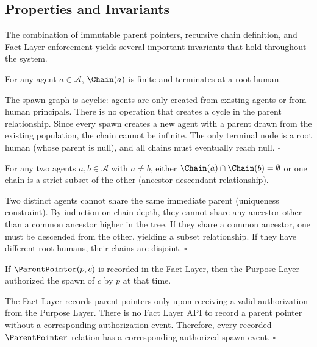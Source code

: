 \begin{algorithm}[H]
\subsection{Properties and Invariants}

The combination of immutable parent pointers, recursive chain definition, and Fact Layer enforcement yields several important invariants that hold throughout the system.

\begin{prop}
For any agent $a \in \mathcal{A}$, $\Chain(a)$ is finite and terminates at a root human.
\end{prop}
\begin{Proof}
The spawn graph is acyclic: agents are only created from existing agents or from human principals. There is no operation that creates a cycle in the parent relationship. Since every spawn creates a new agent with a parent drawn from the existing population, the chain cannot be infinite. The only terminal node is a root human (whose parent is null), and all chains must eventually reach null. $\square$
\end{Proof}

\begin{prop}
For any two agents $a, b \in \mathcal{A}$ with $a \neq b$, either $\Chain(a) \cap \Chain(b) = \emptyset$ or one chain is a strict subset of the other (ancestor-descendant relationship).
\end{prop}
\begin{Proof}
Two distinct agents cannot share the same immediate parent (uniqueness constraint). By induction on chain depth, they cannot share any ancestor other than a common ancestor higher in the tree. If they share a common ancestor, one must be descended from the other, yielding a subset relationship. If they have different root humans, their chains are disjoint. $\square$
\end{Proof}

\begin{prop}
If $\ParentPointer(p, c)$ is recorded in the Fact Layer, then the Purpose Layer authorized the spawn of $c$ by $p$ at that time.
\end{prop}
\begin{Proof}
The Fact Layer records parent pointers only upon receiving a valid authorization from the Purpose Layer. There is no Fact Layer API to record a parent pointer without a corresponding authorization event. Therefore, every recorded $\ParentPointer$ relation has a corresponding authorized spawn event. $\square$
\end{Proof}


\end{algorithm}
